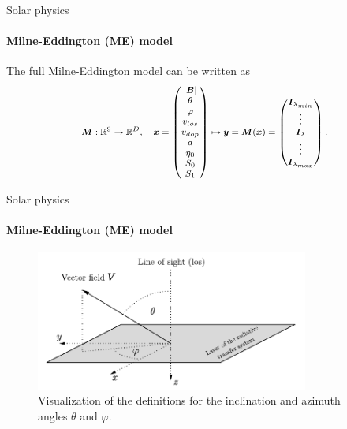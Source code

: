 \documentclass{beamer}
\newcommand\vect[1]{\ensuremath{\bm{#1}}}
\begin{document}
\begin{frame}[allowframebreaks]{Solar physics}
\framesubtitle{Milne-Eddington (ME) model}
%

The full Milne-Eddington model can be written as \begin{gather}\footnotesize\begin{gathered}\label{eq:ME_model_equation}
\vect{M}:\mathbb{R}^9 \rightarrow \mathbb{R}^D, \quad \vect{x} = \begin{pmatrix}
|\vect{B}| \\
\theta \\
\varphi \\
v_{los} \\
v_{dop} \\
a \\
\eta_0 \\
S_0 \\
S_1
\end{pmatrix} \mapsto \vect{y} = \vect{M}(\vect{x}) = \begin{pmatrix}
\vect{I}_{\lambda_{min}} \\
\vdots \\
\vect{I}_{\lambda} \\
\vdots \\
\vect{I}_{\lambda_{max}}
\end{pmatrix}.
\end{gathered}\end{gather}
\end{frame}

\begin{frame}[allowframebreaks]{Solar physics}
	\framesubtitle{Milne-Eddington (ME) model}
\begin{figure}[h]
	\centering
	\includegraphics[width=0.8\textwidth]{figures/thesis/inclinationazimuth.pdf}
	\caption{Visualization of the definitions for the inclination and azimuth angles $\theta$ and $\varphi$.}
\end{figure}
\end{frame}
\end{document}
